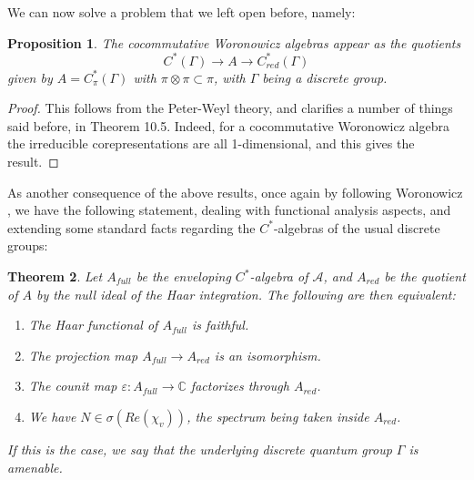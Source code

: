 \documentclass[12pt]{amsbook}
\newtheorem{theorem}{Theorem}[chapter]
\newtheorem{proposition}[theorem]{Proposition}
\begin{document}
We can now solve a problem that we left open before, namely:


\begin{proposition}
The cocommutative Woronowicz algebras appear as the quotients
$$C^*(\Gamma)\to A\to C^*_{red}(\Gamma)$$
given by $A=C^*_\pi(\Gamma)$ with $\pi\otimes\pi\subset\pi$, with $\Gamma$ being a discrete group.
\end{proposition}

\begin{proof}
This follows from the Peter-Weyl theory, and clarifies a number of things said before, in Theorem 10.5. Indeed, for a cocommutative Woronowicz algebra the irreducible corepresentations are all 1-dimensional, and this gives the result.
\end{proof}

As another consequence of the above results, once again by following Woronowicz \cite{wo1}, we have the following statement, dealing with functional analysis aspects, and extending some standard facts regarding the $C^*$-algebras of the usual discrete groups:


\begin{theorem}
Let $A_{full}$ be the enveloping $C^*$-algebra of $\mathcal A$, and $A_{red}$ be the quotient of $A$ by the null ideal of the Haar integration. The following are then equivalent:
\begin{enumerate}
\item The Haar functional of $A_{full}$ is faithful.

\item The projection map $A_{full}\to A_{red}$ is an isomorphism.

\item The counit map $\varepsilon:A_{full}\to\mathbb C$ factorizes through $A_{red}$.

\item We have $N\in\sigma(Re(\chi_v))$, the spectrum being taken inside $A_{red}$.
\end{enumerate}
If this is the case, we say that the underlying discrete quantum group $\Gamma$ is amenable.
\end{theorem}
\end{document}
